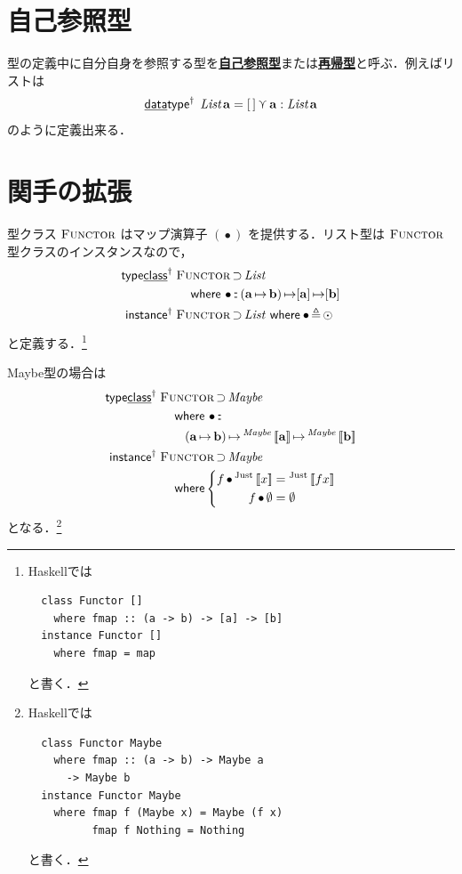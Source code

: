 \documentclass[a4paper,twocolumn]{jsbook}
\def\[{\left[\!\left[}
\def\]{\right]\!\right]}
\newcommand{\programminglanguage}[1]{\textsf{#1}}
\newcommand{\haskell}{\programminglanguage{Haskell}}
\newcommand{\keyword}[1]{{\underline{\textbf{#1}}}}
\newcommand{\mKeyword}[1]{\mathsf{#1}} %
\newcommand{\mKeywordUnderline}[1]{\text{\underline{\textsf{#1}}}} %
\newcommand{\mDataTypeKeyword}{\mKeywordUnderline{data}\mKeyword{type}}
\newcommand{\mInstanceKeyword}{\mKeyword{instance}}
\newcommand{\mTypeClassKeyword}{\mKeyword{type}\mKeywordUnderline{class}}
\newcommand{\mWhereKeyword}{\mKeyword{where}}
\DeclareMathOperator{\mDataTypeParametric}{\mDataTypeKeyword^\dagger}
\DeclareMathOperator{\mInstanceParametric}{\mInstanceKeyword^{\dagger}}
\DeclareMathOperator{\mSuperSet}{\supset}
\DeclareMathOperator{\mTypeClassParametric}{\mTypeClassKeyword^\dagger}
\DeclareMathOperator{\mWhere}{\mWhereKeyword}
\newcommand{\mEmptyList}{{[\,]}}
\newcommand{\mNothing}{\emptyset}
\DeclareMathOperator{\mIn}{{:\!:}}
\DeclareMathOperator{\mLetEq}{\triangleq}
\DeclareMathOperator{\mMap}{\bullet}
\DeclareMathOperator{\mMapList}{\odot}
\DeclareMathOperator{\mMapsTo}{\mapsto}
\DeclareMathOperator{\mValueOr}{\curlyvee}
\newcommand{\mType}[1]{\mathbf{#1}}
\newcommand{\mListType}[1]{[\mType{#1}]}
\newcommand{\mTypeConstructor}[1]{\textit{#1}}
\DeclareMathOperator{\mListTypeConstructor}{\mTypeConstructor{List}}
\DeclareMathOperator{\mMaybeTypeConstructor}{\mTypeConstructor{Maybe}}
\newcommand{\mGenericTypeAssemble}[2]{{}^{\mTypeConstructor{#1}}\[\mType{#2}\]}
\newcommand{\mMaybeType}[1]{\mGenericTypeAssemble{Maybe}{#1}}
\newcommand{\mGenericValueConstructor}[1]{\mathrm{#1}}
\newcommand{\mGenericWith}[2]{{}^\mGenericValueConstructor{#1}\[#2\]}
\newcommand{\mJustWith}[1]{\mGenericWith{Just}{#1}}
\newcommand{\mGenericTypeClass}[1]{\textsc{#1}} %
\newcommand{\mFunctorTypeClass}{\mGenericTypeClass{Functor}}
\newcommand{\mProj}[2]{#1\mMapsTo#2}
\newcommand{\mWhereIs}[2]{\mathbin{\mWhereKeyword}#1\mLetEq#2}
\begin{document}
\section{自己参照型}

型の定義中に自分自身を参照する型を\keyword{自己参照型}または\keyword{再帰型}と呼ぶ．例えばリストは
\begin{equation}
\mDataTypeParametric\;\mListTypeConstructor\mType{a}=\mEmptyList\mValueOr\mType{a}:\mListTypeConstructor\mType{a}
\end{equation}
のように定義出来る．



\section{関手の拡張}

型クラス $\mFunctorTypeClass$ はマップ演算子 $(\mMap)$ を提供する．リスト型は $\mFunctorTypeClass$ 型クラスのインスタンスなので，
\begin{align}
\mTypeClassParametric\;&\mFunctorTypeClass\mSuperSet\mListTypeConstructor\nonumber\\
&\quad\mWhere{}
\mMap\mIn{}\mProj{(\mProj{\mType{a}}{\mType{b}})}{\mProj{\mListType{a}}{\mListType{b}}}\\
\mInstanceParametric\;&\mFunctorTypeClass\mSuperSet\mListTypeConstructor{}\mWhereIs{\mMap}{\mMapList}
\end{align}
と定義する．\footnote{\haskell では
\begin{verbatim}
  class Functor []
    where fmap :: (a -> b) -> [a] -> [b]
  instance Functor []
    where fmap = map
\end{verbatim}
と書く．}

Maybe型の場合は
\begin{align}
\mTypeClassParametric\;&\mFunctorTypeClass\mSuperSet\mMaybeTypeConstructor\nonumber\\
&\quad\mWhere{}\mMap\mIn{}\nonumber\\
&\qquad\mProj{(\mProj{\mType{a}}{\mType{b}})}{\mProj{\mMaybeType{a}}{\mMaybeType{b}}}\\
\mInstanceParametric\;&
\mFunctorTypeClass\mSuperSet\mMaybeTypeConstructor\nonumber\\
&\quad\mWhere
\left\{
\begin{aligned}
f\mMap\mJustWith{x}&=\mJustWith{fx}\\
f\mMap\mNothing&=\mNothing
\end{aligned}
\right.
\end{align}
となる．\footnote{\haskell では
\begin{verbatim}
  class Functor Maybe
    where fmap :: (a -> b) -> Maybe a
      -> Maybe b
  instance Functor Maybe
    where fmap f (Maybe x) = Maybe (f x)
          fmap f Nothing = Nothing
\end{verbatim}
と書く．}
\end{document}
